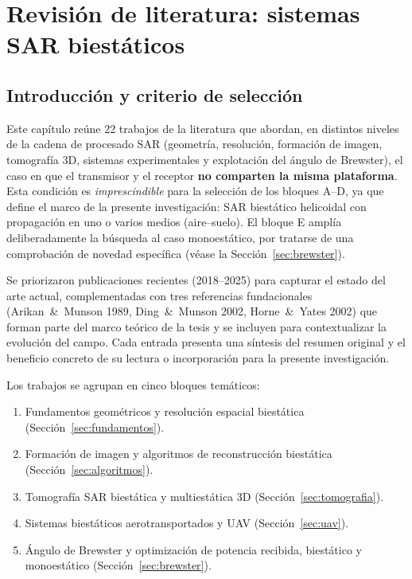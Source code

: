 \documentclass[11pt,a4paper]{report}
\begin{document}
\chapter{Revisión de literatura: sistemas SAR biestáticos}
\label{cap:revision}

\section{Introducción y criterio de selección}
\label{sec:rev_intro}

Este capítulo reúne 22 trabajos de la literatura que abordan, en distintos
niveles de la cadena de procesado SAR (geometría, resolución, formación de
imagen, tomografía 3D, sistemas experimentales y explotación del ángulo de
Brewster), el caso en que el transmisor y el receptor \textbf{no comparten
la misma plataforma}. Esta condición es \emph{imprescindible} para la
selección de los bloques A--D, ya que define el marco de la presente
investigación: SAR biestático helicoidal con propagación en uno o varios
medios (aire--suelo). El bloque E amplía deliberadamente la búsqueda al caso
monoestático, por tratarse de una comprobación de novedad específica
(véase la Sección~\ref{sec:brewster}).

Se priorizaron publicaciones recientes (2018--2025) para capturar el estado
del arte actual, complementadas con tres referencias fundacionales
(Arikan~\&~Munson 1989, Ding~\&~Munson 2002, Horne~\&~Yates 2002) que forman
parte del marco teórico de la tesis y se incluyen para contextualizar la
evolución del campo. Cada entrada presenta una síntesis del resumen original
y el beneficio concreto de su lectura o incorporación para la presente
investigación.

Los trabajos se agrupan en cinco bloques temáticos:
\begin{enumerate}[itemsep=2pt]
  \item Fundamentos geométricos y resolución espacial biestática (Sección~\ref{sec:fundamentos}).
  \item Formación de imagen y algoritmos de reconstrucción biestática (Sección~\ref{sec:algoritmos}).
  \item Tomografía SAR biestática y multiestática 3D (Sección~\ref{sec:tomografia}).
  \item Sistemas biestáticos aerotransportados y UAV (Sección~\ref{sec:uav}).
  \item Ángulo de Brewster y optimización de potencia recibida, biestático y monoestático (Sección~\ref{sec:brewster}).
\end{enumerate}
\end{document}
